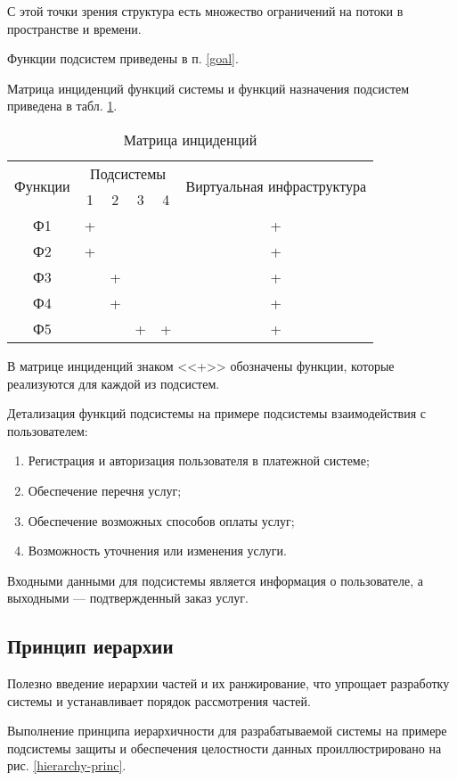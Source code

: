 С этой точки зрения структура есть множество ограничений на потоки в пространстве и времени.

Функции подсистем приведены в п. \ref{goal}.

Матрица инциденций функций системы и функций назначения подсистем приведена в табл. \ref{inc-matrix}.
\begin{table}[H]
  \caption{Матрица инциденций}\label{inc-matrix}
  \begin{tabular}{|c|c|c|c|c|c|}
  \hline \multirow{2}{*}{Функции} & \multicolumn{4}{|c|}{Подсистемы} & \multirow{2}{*}{Виртуальная инфраструктура} \\
  \cline{2-5} & 1 & 2 & 3 & 4 & \\
  \hline Ф1 & + & & & & + \\
  \hline Ф2 & + & & & & + \\
  \hline Ф3 & & + & & & + \\
  \hline Ф4 & & + & & & + \\
  \hline Ф5 & & & + & + & + \\
  \hline 
  \end{tabular}
\end{table}

В матрице инциденций знаком <<+>> обозначены функции, которые реализуются для каждой из подсистем.

Детализация функций подсистемы на примере подсистемы взаимодействия с пользователем:
\begin{enumerate}
  \item Регистрация и авторизация пользователя в платежной системе;
  \item Обеспечение перечня услуг;
  \item Обеспечение возможных способов оплаты услуг;
  \item Возможность уточнения или изменения услуги.
\end{enumerate}

Входными данными для подсистемы является информация о пользователе, а выходными --- подтвержденный заказ услуг.

\subsection{Принцип иерархии}

Полезно введение иерархии частей и их ранжирование, что упрощает разработку системы и устанавливает порядок рассмотрения частей.

Выполнение принципа иерархичности для разрабатываемой системы на примере подсистемы защиты и обеспечения целостности данных проиллюстрировано на рис. \ref{hierarchy-princ}.


